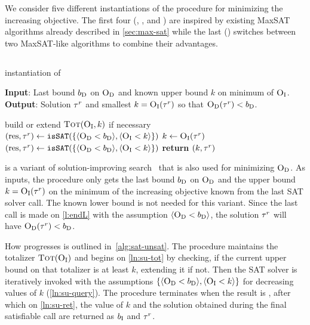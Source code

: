 We consider five different instantiations of the \Min{} procedure for minimizing the increasing objective.
The first four (\satunsat{}, \unsatsat{}, \msu{} and \oll{}) are inspired by existing MaxSAT algorithms already described in \cref{sec:max-sat} while the last (\msh{}) switches between two MaxSAT-like algorithms to combine their advantages.


\subsection{\satunsat{}\label{sec:sat-unsat}}

\begin{algorithm}[t]
  \caption{\satunsat{} instantiation of \Min{}}\label{alg:sat-unsat}
  \textbf{Input}: Last bound $b_{\text{D}}$ on $\textsc{O}_{\text{D}}$ and known upper bound $k$ on minimum of $\textsc{O}_{\text{I}}$. \\
  \textbf{Output}: Solution $\tau^r$ and smallest $k=\textsc{O}_{\text{I}}(\tau^r)$ so that $\textsc{O}_{\text{D}}(\tau^r)<b_{\text{D}}$.

  \begin{algorithmic}[1]
    \STATE build or extend $\textsc{Tot}(\textsc{O}_{\text{I}},k)$ if necessary \label{ln:su-tot}
    \STATE $(\text{res},\tau^r) \gets \texttt{isSAT}(\{\langle \textsc{O}_{\text{D}} < b_{\text{D}} \rangle, \langle \textsc{O}_{\text{I}} < k \rangle\})$
    \WHILE{$\res = \sat$}
      \STATE $k \gets \textsc{O}_{\text{I}}(\tau^r)$
      \STATE $(\text{res},\tau^r) \gets \texttt{isSAT}(\{\langle \textsc{O}_{\text{D}} < b_{\text{D}} \rangle, \langle \textsc{O}_{\text{I}} < k \rangle\})$ \label{ln:su-query}
    \ENDWHILE
    \STATE \textbf{return} $(k,\tau^r)$ \label{ln:su-ret}
  \end{algorithmic}
\end{algorithm}

\satunsat{} is a variant of solution-improving search~\autocites{handbook2-maxsat,DBLP:journals/jsat/BerreP10,DBLP:journals/jsat/EenS06} that is also used for minimizing $\textsc{O}_{\text{D}}$. 
As inputs, the procedure only gets the last bound $b_{\text{D}}$ on $\textsc{O}_{\text{D}}$ and the upper bound $k=\textsc{O}_{\text{I}}(\tau^r)$ on the minimum of the increasing objective known from the last SAT solver call.
The known lower bound is not needed for this variant.
Since the last call is made on \cref{l:endL} with the assumption $\langle \textsc{O}_{\text{D}} < b_{\text{D}} \rangle$, the solution $\tau^r$ will have $\textsc{O}_{\text{D}}(\tau^r) < b_{\text{D}}$. 

How \satunsat{} progresses is outlined in~\cref{alg:sat-unsat}.
The procedure maintains the totalizer $\textsc{Tot}(\textsc{O}_{\text{I}})$ and begins on \cref{ln:su-tot} by checking, if the current upper bound on that totalizer is at least $k$, extending it if not. 
Then the SAT solver is iteratively invoked with the assumptions $\{\langle \textsc{O}_{\text{D}} < b_{\text{D}} \rangle, \langle \textsc{O}_{\text{I}} < k \rangle\}$ for decreasing values of $k$ (\cref{ln:su-query}).
The procedure terminates when the result is \unsat{}, after which on \cref{ln:su-ret}, the value of $k$ and the solution obtained during the final satisfiable call are returned as $b_{\text{I}}$ and $\tau^r$.  


